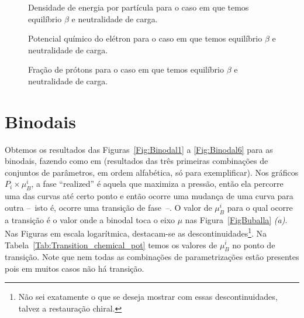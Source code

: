 \begin{figure}
	
	\caption{Densidade de energia por partícula para o caso em que temos equilíbrio $\beta$ e neutralidade de carga. \protect}
	\label{Fig:energy_per_particle_beta_equil}
\end{figure}

\begin{figure}
	
	\caption{Potencial químico do elétron para o caso em que temos equilíbrio $\beta$ e neutralidade de carga. \protect}
	\label{Fig:Electron_chemical_potential_beta_equil}
\end{figure}

\begin{figure}
	
	\caption{Fração de prótons para o caso em que temos equilíbrio $\beta$ e neutralidade de carga. \protect}
	\label{Fig:Proton_fraction_beta_equil}
\end{figure}

\section{Binodais}

Obtemos os resultados das Figuras~\ref{Fig:Binodal1} a \ref{Fig:Binodal6} para as binodais, fazendo como em \textcite{japoneses2} (resultados das três primeiras combinações de conjuntos de parâmetros, em ordem alfabética, só para exemplificar). Nos gráficos $P_i \times \mu_B^i$, a fase ``realized'' é aquela que maximiza a pressão, então ela percorre uma das curvas até certo ponto e então ocorre uma mudança de uma curva para outra --~isto é, ocorre uma transição de fase~--. O valor de $\mu_B^i$ para o qual ocorre a transição é o valor onde a binodal toca o eixo $\mu$ nas Figura~\ref{FigBuballa} \emph{(a)}. Nas Figuras em escala logarítmica, destacam-se as descontinuidades\footnote{Não sei exatamente o que se deseja mostrar com essas descontinuidades, talvez a restauração chiral.}. Na Tabela~\ref{Tab:Transition_chemical_pot} temos os valores de $\mu_B^i$ no ponto de transição. Note que nem todas as combinações de parametrizações estão presentes pois em muitos casos não há transição.


